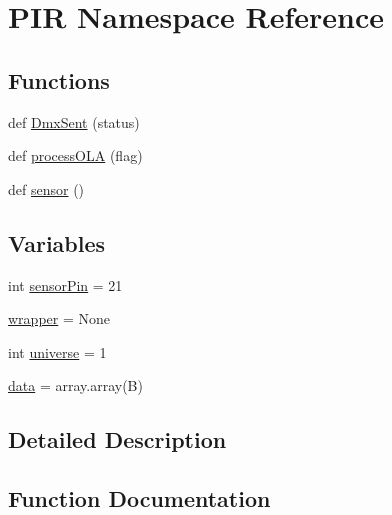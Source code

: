 \hypertarget{namespacePIR}{}\section{P\+IR Namespace Reference}
\label{namespacePIR}
\subsection*{Functions}
\begin{DoxyCompactItemize}
\item 
def \hyperlink{namespacePIR_a3ac8568113a155231b15ea38bf802371}{Dmx\+Sent} (status)
\item 
def \hyperlink{namespacePIR_a73b3e8262186dd13e1241f48eb9c4870}{process\+O\+LA} (flag)
\item 
def \hyperlink{namespacePIR_a4004ed7a5eb2d52ce539fffd7b6db672}{sensor} ()
\end{DoxyCompactItemize}
\subsection*{Variables}
\begin{DoxyCompactItemize}
\item 
int \hyperlink{namespacePIR_a65a96d98ec0e9ec25e91c0dcee16a613}{sensor\+Pin} = 21
\item 
\hyperlink{namespacePIR_a20f17a4234d94696dd7e9474ae30bb23}{wrapper} = None
\item 
int \hyperlink{namespacePIR_a7db1cd298280d11c130c963a2181665f}{universe} = 1
\item 
\hyperlink{namespacePIR_aafc26dea0dec5027c9733ee5f828f40c}{data} = array.\+array(\textquotesingle{}B\textquotesingle{})
\end{DoxyCompactItemize}


\subsection{Detailed Description}
 

\subsection{Function Documentation}
